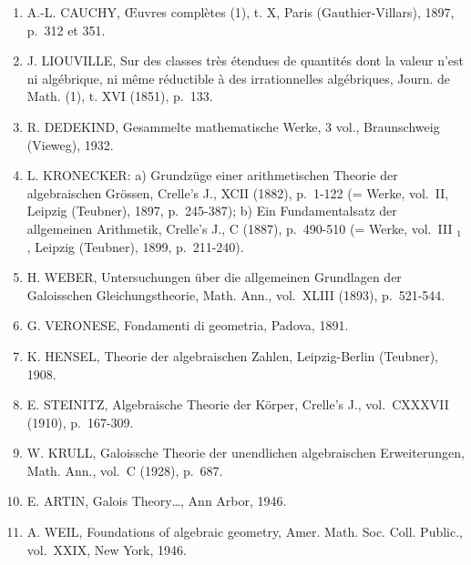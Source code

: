 \begin{enumerate}
  E. GALOIS, Œuvres mathématiques, Paris (Gauthier-Villars), 1897.
\item
  A.-L. CAUCHY, Œuvres complètes (1), t. X, Paris (Gauthier-Villars), 1897, p.~312 et 351.
\item
  J. LIOUVILLE, Sur des classes très étendues de quantités dont la valeur n'est ni algébrique, ni même réductible à des irrationnelles algébriques, Journ. de Math. (1), t. XVI (1851), p.~133.
\item
  R. DEDEKIND, Gesammelte mathematische Werke, 3 vol., Braunschweig (Vieweg), 1932.
\item
  L. KRONECKER: a) Grundzüge einer arithmetischen Theorie der algebraischen Grössen, Crelle's J., XCII (1882), p.~1-122 (= Werke, vol.~II, Leipzig (Teubner), 1897, p.~245-387); b) Ein Fundamentalsatz der allgemeinen Arithmetik, Crelle's J., C (1887), p.~490-510 (= Werke, vol.~III \(_{1}\) , Leipzig (Teubner), 1899, p.~211-240).
\item
  H. WEBER, Untersuchungen über die allgemeinen Grundlagen der Galoisschen Gleichungstheorie, Math. Ann., vol.~XLIII (1893), p.~521-544.
\item
  G. VERONESE, Fondamenti di geometria, Padova, 1891.
\item
  K. HENSEL, Theorie der algebraischen Zahlen, Leipzig-Berlin (Teubner), 1908.
\item
  E. STEINITZ, Algebraische Theorie der Körper, Crelle's J., vol.~CXXXVII (1910), p.~167-309.
\item
  W. KRULL, Galoissche Theorie der unendlichen algebraischen Erweiterungen, Math. Ann., vol.~C (1928), p.~687.
\item
  E. ARTIN, Galois Theory\ldots, Ann Arbor, 1946.
\item
  A. WEIL, Foundations of algebraic geometry, Amer. Math. Soc. Coll. Public., vol.~XXIX, New York, 1946.
\end{enumerate}

